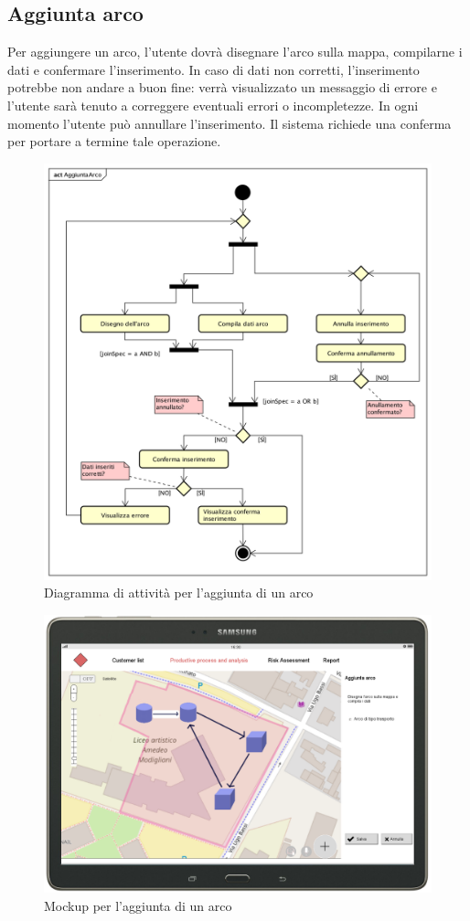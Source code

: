 \newpage
\subsection{Aggiunta arco}
Per aggiungere un arco, l'utente dovrà disegnare l'arco sulla mappa, compilarne i dati e confermare l'inserimento. In caso di dati non corretti, l'inserimento potrebbe non andare a buon fine: verrà visualizzato un messaggio di errore e l'utente sarà tenuto a correggere eventuali errori o incompletezze.
In ogni momento l'utente può annullare l'inserimento. Il sistema richiede una conferma per portare a termine tale operazione.
\begin{figure}[H]
	\centering
	\includegraphics[width=\textwidth]{img/DiagrammiDiAttivita/AggiuntaArco.png}
	\caption{Diagramma di attività per l'aggiunta di un arco}
\end{figure}
\begin{figure}[H]
	\centering
	\includegraphics[width=\textwidth]{img/MockUp/m18.png}
	\caption{Mockup per l'aggiunta di un arco}
\end{figure}

